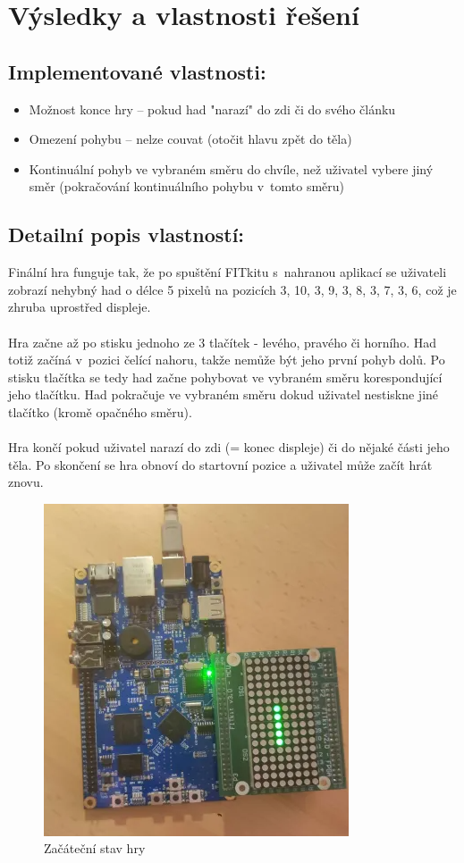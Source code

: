 \documentclass[]{fitiel} %
\begin{document}
    \newpage
    \section{Výsledky a vlastnosti řešení}
    \subsection{Implementované vlastnosti:}
    \begin{itemize}
        \item Možnost konce hry -- pokud had "narazí" do zdi či do svého článku
        \item Omezení pohybu -- nelze couvat (otočit hlavu zpět do těla)
        \item Kontinuální pohyb ve vybraném směru do chvíle, než uživatel vybere jiný směr (pokračování kontinuálního pohybu v~tomto směru)
    \end{itemize}


    \subsection{Detailní popis vlastností:}
    Finální hra funguje tak, že po spuštění FITkitu s~nahranou aplikací se uživateli zobrazí nehybný had o délce 5 pixelů na pozicích {3, 10}, {3, 9}, {3, 8}, {3, 7}, {3, 6}, což je zhruba uprostřed displeje. 
    \\\\
    Hra začne až po stisku jednoho ze 3 tlačítek - levého, pravého či horního. Had totiž začíná v~pozici čelící nahoru, takže nemůže být jeho první pohyb dolů. Po stisku tlačítka se tedy had začne pohybovat ve vybraném směru korespondující jeho tlačítku. Had pokračuje ve vybraném směru dokud uživatel nestiskne jiné tlačítko (kromě opačného směru).
    \\\\
    Hra končí pokud uživatel narazí do zdi (= konec displeje) či do nějaké části jeho těla. Po skončení se hra obnoví do startovní pozice a uživatel může začít hrát znovu.

    \begin{figure}[h]
      \centering
      \includegraphics{fig/start.png}
      \caption{Začáteční stav hry}
    \end{figure}
\end{document}

